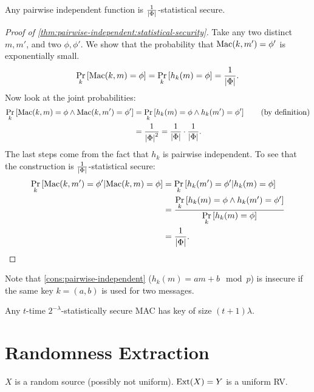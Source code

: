 \begin{theorem} \label{thm:pairwise-independent:statistical-security}
	Any pairwise independent function is $\frac{1}{\abs{\GenericAuthSpace}}$-statistical secure.
\end{theorem}

\begin{proof}[Proof of \cref{thm:pairwise-independent:statistical-security}]
	Take any two distinct $m, m'$, and two $\phi, \phi'$.
	We show that the probability that $\GenericMac(k,m') = \phi'$ is exponentially small.
	\begin{equation*}
		\Pr[k]{\GenericMac(k,m) = \phi} =
		\Pr[k]{h_k(m) = \phi} =
		\frac{1}{\abs{\GenericAuthSpace}}.
	\end{equation*}
	Now look at the joint probabilities:
	\begin{align*}
		\Pr[k]{\GenericMac(k,m) = \phi \land \GenericMac(k,m') = \phi'} 
		& = 
		\Pr[k]{h_k(m) = \phi \land h_k(m') = \phi'} 
		\tag{by definition}
		\\
		& =
		\frac{1}{\abs{\GenericAuthSpace}^2}
		=
		\frac{1}{\abs{\GenericAuthSpace}}
		\cdot
		\frac{1}{\abs{\GenericAuthSpace}}.
	\end{align*}
	The last steps come from the fact that $h_k$ is pairwise independent.
	To see that the construction is $\frac{1}{\abs{\GenericAuthSpace}}$-statistical secure:
	\begin{align*}
		\Pr[k]{\GenericMac(k, m') = \phi' | \GenericMac(k,m) = \phi}
		& =
		\Pr[k]{h_k(m') = \phi' | h_k(m) = \phi}
		\\
		& =
		\frac{\Pr[k]{h_k(m) = \phi \land h_k(m') = \phi'}}{\Pr[k]{h_k(m) = \phi}}
		\\
		& =
		\frac{1}{\abs{\GenericAuthSpace}}.
	\end{align*}
\end{proof}

Note that \cref{cons:pairwise-independent} ($h_k(m) = a m + b \mod p$) is insecure if the same key $k = (a,b)$ is used for two messages.

\begin{theorem}
	Any $t$-time $2^{-\lambda}$-statistically secure \ac{MAC} has key of size $(t+1)\lambda$.
\end{theorem}


\section{Randomness Extraction}

$X$ is a random source (possibly not uniform).
$\Ext(X) = Y$ is a uniform \ac{RV}.

